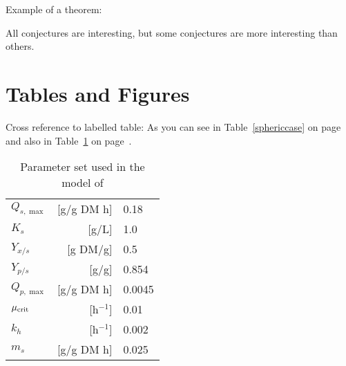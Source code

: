 \documentclass{kluwer}    %
\begin{document}
\begin{article}
Example of a theorem:


\begin{guess}
All conjectures are interesting, but some conjectures are more
interesting than others.
\end{guess}


\section{Tables and Figures}
Cross reference to labelled table: As you can see in Table~\ref{sphericcase} on 
page~\pageref{sphericcase} and also in Table~\ref{parset} on page~\pageref{parset}.





\begin{table} %
\begin{tabular}{lrl}                                        
\hline
$Q_{s,\max}$   & [g/g DM h]  & 0.18\\
$K_{s}$       & [g/L]        & 1.0\\
$Y_{x/s}$     & [g DM/g]     & 0.5\\
$Y_{p/s}$     & [g/g]        & 0.854\\
$Q_{p,\max}$   & [g/g DM h]  & 0.0045\\
$\mu_{\rm crit}$  & [h$^{-1}$]  & 0.01\\
$k_{h}$       & [h$^{-1}$]  & 0.002\\
$m_{s}$       & [g/g DM h]  & 0.025\\                              
\hline
\end{tabular}
\caption[]{Parameter set used in the model of }\label{parset}
\end{table}


\end{article}
\end{document}
